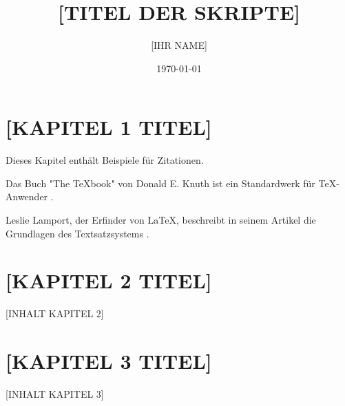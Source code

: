 \documentclass[a4paper,12pt,ngerman]{report}
\title{[TITEL DER SKRIPTE]}
\author{[IHR NAME]}
\date{\today}
\begin{document}
	
	\maketitle
	\thispagestyle{empty}
	
	\tableofcontents
	
	\cleardoublepage
	\setcounter{page}{1}
	
	\chapter{[KAPITEL 1 TITEL]}
	Dieses Kapitel enthält Beispiele für Zitationen. 
	
	Das Buch "The TeXbook" von Donald E. Knuth ist ein Standardwerk für TeX-Anwender \autocite{knuth1984}.
	
	Leslie Lamport, der Erfinder von LaTeX, beschreibt in seinem Artikel die Grundlagen des Textsatzsystems \autocite{lamport1994}.
	
	\chapter{[KAPITEL 2 TITEL]}
	[INHALT KAPITEL 2]
	
	\chapter{[KAPITEL 3 TITEL]}
	[INHALT KAPITEL 3]
	
	\printbibliography
	
\end{document}
